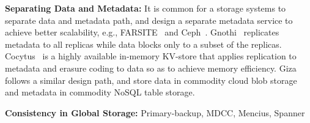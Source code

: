 
{\bf Separating Data and Metadata:}
It is common for a storage systems to separate data and metadata path, and design a separate metadata service to achieve better scalability, e.g., FARSITE~\cite{adya2002farsite} and Ceph~\cite{weil2006ceph}. Gnothi~\cite{wang2012gnothi} replicates metadata to all replicas while data blocks only to a subset of the replicas. Cocytus~\cite{zhang2016efficient} is a highly available in-memory KV-store that applies replication to metadata and erasure coding to data so as to achieve memory efficiency.
Giza follows a similar design path, and store data in commodity cloud blob storage and metadata in commodity NoSQL table storage.

{\bf Consistency in Global Storage:}
Primary-backup, MDCC, Mencius, Spanner

